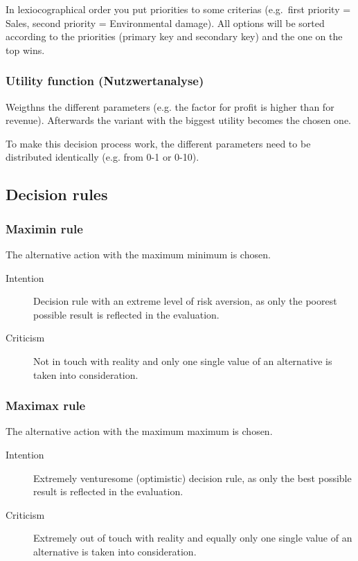 In lexiocographical order you put priorities to some criterias
(e.g.~first priority = Sales, second priority = Environmental damage).
All options will be sorted according to the priorities (primary key and
secondary key) and the one on the top wins.

\subsubsection{Utility function (Nutzwertanalyse)}

Weigthns the different parameters (e.g. the factor for profit is higher
than for revenue). Afterwards the variant with the biggest utility becomes
the chosen one.

To make this decision process work, the different parameters need to be
distributed identically (e.g. from 0-1 or 0-10).

\subsection{Decision rules}

\subsubsection{Maximin rule}

The alternative action with the maximum minimum is chosen.

\begin{description}
	\item[Intention] Decision rule with an extreme level of risk
	aversion, as only the poorest possible result is reflected in the
	evaluation.
	\item[Criticism] Not in touch with reality and only one single value
	of an alternative is taken into consideration.
\end{description}


\subsubsection{Maximax rule}

The alternative action with the maximum maximum is chosen.

\begin{description}
	\item[Intention] Extremely venturesome (optimistic) decision rule, as
	only the best possible result is reflected in the evaluation.
	\item[Criticism] Extremely out of touch with reality and equally only
	one single value of an alternative is taken into consideration.
\end{description}


